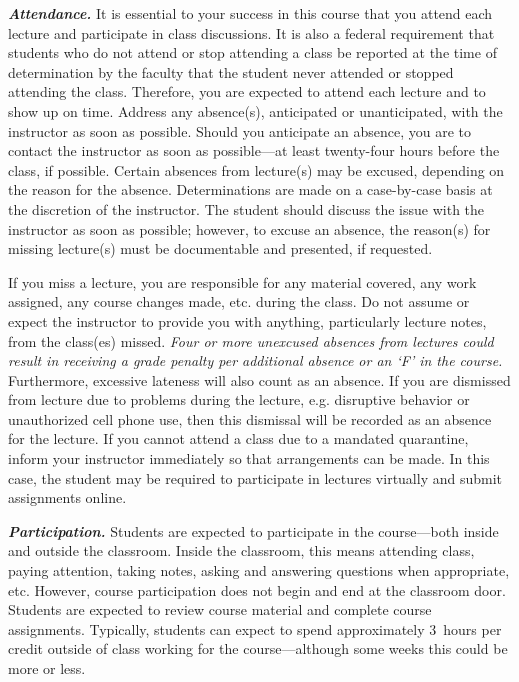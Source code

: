 \documentclass[11pt,letterpaper]{article}
\begin{document}
{\itshape\bfseries\color{stacred}Attendance.} It is essential to your success in this course that you attend each lecture and participate in class discussions. It is also a federal requirement that students who do not attend or stop attending a class be reported at the time of determination by the faculty that the student never attended or stopped attending the class. Therefore, you are expected to attend each lecture and to show up on time. Address any absence(s), anticipated or unanticipated, with the instructor as soon as possible. Should you anticipate an absence, you are to contact the instructor as soon as possible---at least twenty-four hours before the class, if possible.  Certain absences from lecture(s) may be excused, depending on the reason for the absence. Determinations are made on a case-by-case basis at the discretion of the instructor. The student should discuss the issue with the instructor as soon as possible; however, to excuse an absence, the reason(s) for missing lecture(s) must be documentable and presented, if requested. \pspace

If you miss a lecture, you are responsible for any material covered, any work assigned, any course changes made, etc. during the class. Do not assume or expect the instructor to provide you with anything, particularly lecture notes, from the class(es) missed. {\itshape Four or more unexcused absences from lectures could result in receiving a grade penalty per additional absence or an `F' in the course.} Furthermore, excessive lateness will also count as an absence. If you are dismissed from lecture due to problems during the lecture, e.g. disruptive behavior or unauthorized cell phone use, then this dismissal will be recorded as an absence for the lecture. If you cannot attend a class due to a mandated quarantine, inform your instructor immediately so that arrangements can be made. In this case, the student may be required to participate in lectures virtually and submit assignments online. \pspace

{\itshape\bfseries\color{stacred}Participation.} Students are expected to participate in the course---both inside and outside the classroom. Inside the classroom, this means attending class, paying attention, taking notes, asking and answering questions when appropriate, etc. However, course participation does not begin and end at the classroom door. Students are expected to review course material and complete course assignments. Typically, students can expect to spend approximately 3~hours per credit outside of class working for the course---although some weeks this could be more or less. \pspace
\end{document}
